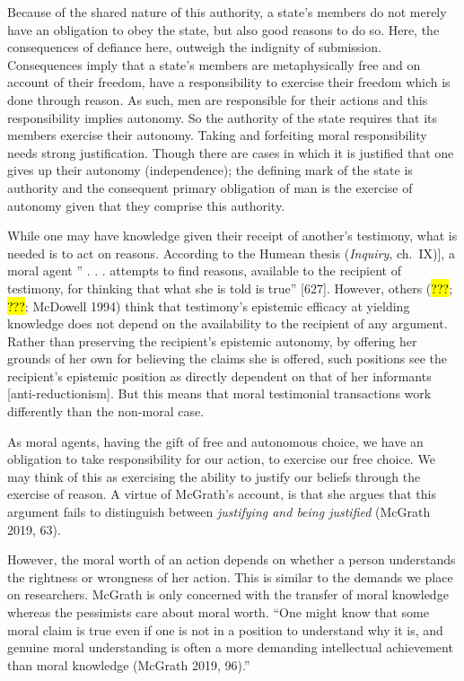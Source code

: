 \documentclass[
  letterpaper,
  DIV=11,
  numbers=noendperiod]{scrartcl}
\theoremstyle{remark}
\begin{document}
Because of the shared nature of this authority, a state's members do not
merely have an obligation to obey the state, but also good reasons to do
so. Here, the consequences of defiance here, outweigh the indignity of
submission. Consequences imply that a state's members are metaphysically
free and on account of their freedom, have a responsibility to exercise
their freedom which is done through reason. As such, men are responsible
for their actions and this responsibility implies autonomy. So the
authority of the state requires that its members exercise their
autonomy. Taking and forfeiting moral responsibility needs strong
justification. Though there are cases in which it is justified that one
gives up their autonomy (independence); the defining mark of the state
is authority and the consequent primary obligation of man is the
exercise of autonomy given that they comprise this authority.

While one may have knowledge given their receipt of another's testimony,
what is needed is to act on reasons. According to the Humean thesis
(\emph{Inquiry}, ch.~IX){]}, a moral agent '' . . . attempts to find
reasons, available to the recipient of testimony, for thinking that what
she is told is true'' {[}627{]}. However, others (\hl{???}; \hl{???};
McDowell 1994) think that testimony's epistemic efficacy at yielding
knowledge does not depend on the availability to the recipient of any
argument. Rather than preserving the recipient's epistemic autonomy, by
offering her grounds of her own for believing the claims she is offered,
such positions see the recipient's epistemic position as directly
dependent on that of her informants {[}anti-reductionism{]}. But this
means that moral testimonial transactions work differently than the
non-moral case.

As moral agents, having the gift of free and autonomous choice, we have
an obligation to take responsibility for our action, to exercise our
free choice. We may think of this as exercising the ability to justify
our beliefs through the exercise of reason. A virtue of McGrath's
account, is that she argues that this argument fails to distinguish
between \emph{justifying and being justified} (McGrath 2019, 63).

However, the moral worth of an action depends on whether a person
understands the rightness or wrongness of her action. This is similar to
the demands we place on researchers. McGrath is only concerned with the
transfer of moral knowledge whereas the pessimists care about moral
worth. ``One might know that some moral claim is true even if one is not
in a position to understand why it is, and genuine moral understanding
is often a more demanding intellectual achievement than moral knowledge
(McGrath 2019, 96).''
\end{document}
